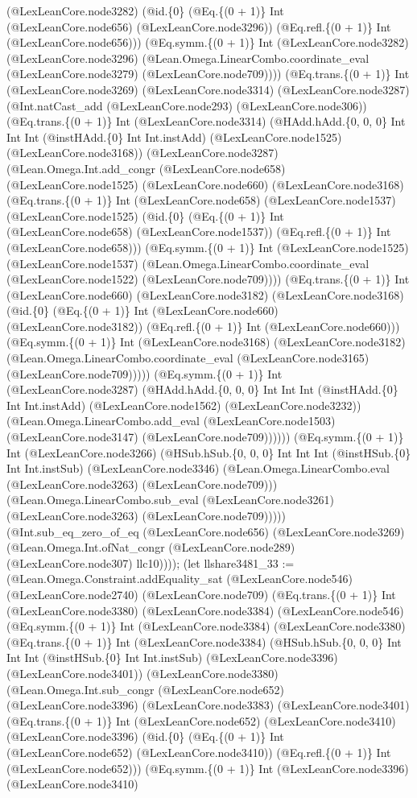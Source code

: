 \documentclass[11pt]{article}
\begin{document}
(@LexLeanCore.node3282) (@id.\{0\} (@Eq.\{(0 + 1)\} Int (@LexLeanCore.node656) (@LexLeanCore.node3296)) (@Eq.refl.\{(0 + 1)\} Int (@LexLeanCore.node656))) (@Eq.symm.\{(0 + 1)\} Int (@LexLeanCore.node3282) (@LexLeanCore.node3296) (@Lean.Omega.LinearCombo.coordinate\_eval (@LexLeanCore.node3279) (@LexLeanCore.node709)))) (@Eq.trans.\{(0 + 1)\} Int (@LexLeanCore.node3269) (@LexLeanCore.node3314) (@LexLeanCore.node3287) (@Int.natCast\_add (@LexLeanCore.node293) (@LexLeanCore.node306)) (@Eq.trans.\{(0 + 1)\} Int (@LexLeanCore.node3314) (@HAdd.hAdd.\{0, 0, 0\} Int Int Int (@instHAdd.\{0\} Int Int.instAdd) (@LexLeanCore.node1525) (@LexLeanCore.node3168)) (@LexLeanCore.node3287) (@Lean.Omega.Int.add\_congr (@LexLeanCore.node658) (@LexLeanCore.node1525) (@LexLeanCore.node660) (@LexLeanCore.node3168) (@Eq.trans.\{(0 + 1)\} Int (@LexLeanCore.node658) (@LexLeanCore.node1537) (@LexLeanCore.node1525) (@id.\{0\} (@Eq.\{(0 + 1)\} Int (@LexLeanCore.node658) (@LexLeanCore.node1537)) (@Eq.refl.\{(0 + 1)\} Int (@LexLeanCore.node658))) (@Eq.symm.\{(0 + 1)\} Int (@LexLeanCore.node1525) (@LexLeanCore.node1537) (@Lean.Omega.LinearCombo.coordinate\_eval (@LexLeanCore.node1522) (@LexLeanCore.node709)))) (@Eq.trans.\{(0 + 1)\} Int (@LexLeanCore.node660) (@LexLeanCore.node3182) (@LexLeanCore.node3168) (@id.\{0\} (@Eq.\{(0 + 1)\} Int (@LexLeanCore.node660) (@LexLeanCore.node3182)) (@Eq.refl.\{(0 + 1)\} Int (@LexLeanCore.node660))) (@Eq.symm.\{(0 + 1)\} Int (@LexLeanCore.node3168) (@LexLeanCore.node3182) (@Lean.Omega.LinearCombo.coordinate\_eval (@LexLeanCore.node3165) (@LexLeanCore.node709))))) (@Eq.symm.\{(0 + 1)\} Int (@LexLeanCore.node3287) (@HAdd.hAdd.\{0, 0, 0\} Int Int Int (@instHAdd.\{0\} Int Int.instAdd) (@LexLeanCore.node1562) (@LexLeanCore.node3232)) (@Lean.Omega.LinearCombo.add\_eval (@LexLeanCore.node1503) (@LexLeanCore.node3147) (@LexLeanCore.node709)))))) (@Eq.symm.\{(0 + 1)\} Int (@LexLeanCore.node3266) (@HSub.hSub.\{0, 0, 0\} Int Int Int (@instHSub.\{0\} Int Int.instSub) (@LexLeanCore.node3346) (@Lean.Omega.LinearCombo.eval (@LexLeanCore.node3263) (@LexLeanCore.node709))) (@Lean.Omega.LinearCombo.sub\_eval (@LexLeanCore.node3261) (@LexLeanCore.node3263) (@LexLeanCore.node709))))) (@Int.sub\_eq\_zero\_of\_eq (@LexLeanCore.node656) (@LexLeanCore.node3269) (@Lean.Omega.Int.ofNat\_congr (@LexLeanCore.node289) (@LexLeanCore.node307) llc10)))); (let llshare3481\_33 := (@Lean.Omega.Constraint.addEquality\_sat (@LexLeanCore.node546) (@LexLeanCore.node2740) (@LexLeanCore.node709) (@Eq.trans.\{(0 + 1)\} Int (@LexLeanCore.node3380) (@LexLeanCore.node3384) (@LexLeanCore.node546) (@Eq.symm.\{(0 + 1)\} Int (@LexLeanCore.node3384) (@LexLeanCore.node3380) (@Eq.trans.\{(0 + 1)\} Int (@LexLeanCore.node3384) (@HSub.hSub.\{0, 0, 0\} Int Int Int (@instHSub.\{0\} Int Int.instSub) (@LexLeanCore.node3396) (@LexLeanCore.node3401)) (@LexLeanCore.node3380) (@Lean.Omega.Int.sub\_congr (@LexLeanCore.node652) (@LexLeanCore.node3396) (@LexLeanCore.node3383) (@LexLeanCore.node3401) (@Eq.trans.\{(0 + 1)\} Int (@LexLeanCore.node652) (@LexLeanCore.node3410) (@LexLeanCore.node3396) (@id.\{0\} (@Eq.\{(0 + 1)\} Int (@LexLeanCore.node652) (@LexLeanCore.node3410)) (@Eq.refl.\{(0 + 1)\} Int (@LexLeanCore.node652))) (@Eq.symm.\{(0 + 1)\} Int (@LexLeanCore.node3396) (@LexLeanCore.node3410) 
\end{document}
